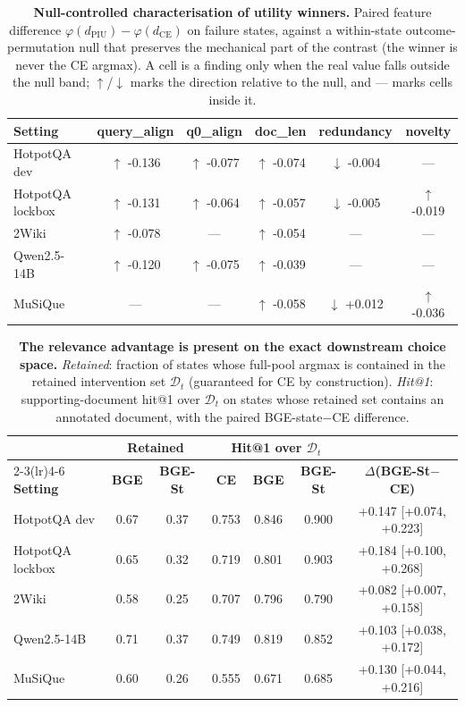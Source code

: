 \begin{table}[t]
\centering
\small
\caption{\textbf{Null-controlled characterisation of utility winners.}
Paired feature difference $\varphi(d_{\mathrm{PIU}})-\varphi(d_{\mathrm{CE}})$
on failure states, against a within-state outcome-permutation null that
preserves the mechanical part of the contrast (the winner is never the
CE argmax). A cell is a finding only when the real value falls outside
the null band; $\uparrow$/$\downarrow$ marks the direction relative to
the null, and --- marks cells inside it.}
\label{tab:winnerchar}
\begin{tabular}{lccccc}
\toprule
\textbf{Setting} & \textbf{query\_align} & \textbf{q0\_align} & \textbf{doc\_len} & \textbf{redundancy} & \textbf{novelty} \\
\midrule
HotpotQA dev & $\uparrow$ -0.136 & $\uparrow$ -0.077 & $\uparrow$ -0.074 & $\downarrow$ -0.004 & --- \\
HotpotQA lockbox & $\uparrow$ -0.131 & $\uparrow$ -0.064 & $\uparrow$ -0.057 & $\downarrow$ -0.005 & $\uparrow$ -0.019 \\
2Wiki & $\uparrow$ -0.078 & --- & $\uparrow$ -0.054 & --- & --- \\
Qwen2.5-14B & $\uparrow$ -0.120 & $\uparrow$ -0.075 & $\uparrow$ -0.039 & --- & --- \\
MuSiQue & --- & --- & $\uparrow$ -0.058 & $\downarrow$ +0.012 & $\uparrow$ -0.036 \\
\bottomrule
\end{tabular}
\end{table}

\begin{table}[t]
\centering
\small
\caption{\textbf{The relevance advantage is present on the exact
downstream choice space.} \emph{Retained}: fraction of states whose
full-pool argmax is contained in the retained intervention set
$\mathcal{D}_t$ (guaranteed for CE by construction). \emph{Hit@1}:
supporting-document hit@1 over $\mathcal{D}_t$ on states whose retained
set contains an annotated document, with the paired BGE-state$-$CE
difference.}
\label{tab:choicespace}
\begin{tabular}{lcccccc}
\toprule
& \multicolumn{2}{c}{\textbf{Retained}} & \multicolumn{3}{c}{\textbf{Hit@1 over $\mathcal{D}_t$}} & \\
\cmidrule(lr){2-3}\cmidrule(lr){4-6}
\textbf{Setting} & \textbf{BGE} & \textbf{BGE-St} & \textbf{CE} & \textbf{BGE} & \textbf{BGE-St} & \textbf{$\Delta$(BGE-St$-$CE)} \\
\midrule
HotpotQA dev & 0.67 & 0.37 & 0.753 & 0.846 & 0.900 & +0.147 [+0.074, +0.223] \\
HotpotQA lockbox & 0.65 & 0.32 & 0.719 & 0.801 & 0.903 & +0.184 [+0.100, +0.268] \\
2Wiki & 0.58 & 0.25 & 0.707 & 0.796 & 0.790 & +0.082 [+0.007, +0.158] \\
Qwen2.5-14B & 0.71 & 0.37 & 0.749 & 0.819 & 0.852 & +0.103 [+0.038, +0.172] \\
MuSiQue & 0.60 & 0.26 & 0.555 & 0.671 & 0.685 & +0.130 [+0.044, +0.216] \\
\bottomrule
\end{tabular}
\end{table}

